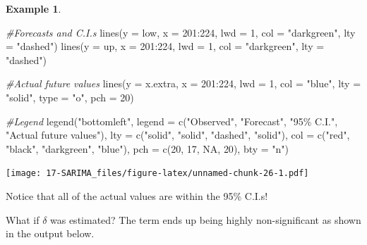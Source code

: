 \documentclass[
]{book}
\newenvironment{Shaded}{\begin{snugshade}}{\end{snugshade}}
\newcommand{\AttributeTok}[1]{\textcolor[rgb]{0.77,0.63,0.00}{#1}}
\newcommand{\CommentTok}[1]{\textcolor[rgb]{0.56,0.35,0.01}{\textit{#1}}}
\newcommand{\ConstantTok}[1]{\textcolor[rgb]{0.00,0.00,0.00}{#1}}
\newcommand{\DecValTok}[1]{\textcolor[rgb]{0.00,0.00,0.81}{#1}}
\newcommand{\FunctionTok}[1]{\textcolor[rgb]{0.00,0.00,0.00}{#1}}
\newcommand{\NormalTok}[1]{#1}
\newcommand{\SpecialCharTok}[1]{\textcolor[rgb]{0.00,0.00,0.00}{#1}}
\newcommand{\StringTok}[1]{\textcolor[rgb]{0.31,0.60,0.02}{#1}}
\theoremstyle{definition}
\theoremstyle{definition}
\newtheorem{example}{Example}[chapter]
\theoremstyle{definition}
\theoremstyle{definition}
\theoremstyle{remark}
\begin{document}
\begin{example}
\begin{Shaded}
\begin{Highlighting}[]
\CommentTok{\#Forecasts and C.I.s}
  \FunctionTok{lines}\NormalTok{(}\AttributeTok{y =}\NormalTok{ low, }\AttributeTok{x =} \DecValTok{201}\SpecialCharTok{:}\DecValTok{224}\NormalTok{, }\AttributeTok{lwd =} \DecValTok{1}\NormalTok{, }\AttributeTok{col =} \StringTok{"darkgreen"}\NormalTok{, }\AttributeTok{lty =} \StringTok{"dashed"}\NormalTok{) }
  \FunctionTok{lines}\NormalTok{(}\AttributeTok{y =}\NormalTok{ up, }\AttributeTok{x =} \DecValTok{201}\SpecialCharTok{:}\DecValTok{224}\NormalTok{, }\AttributeTok{lwd =} \DecValTok{1}\NormalTok{, }\AttributeTok{col =} \StringTok{"darkgreen"}\NormalTok{, }\AttributeTok{lty =} \StringTok{"dashed"}\NormalTok{) }
  
\CommentTok{\#Actual future values}
  \FunctionTok{lines}\NormalTok{(}\AttributeTok{y =}\NormalTok{ x.extra, }\AttributeTok{x =} \DecValTok{201}\SpecialCharTok{:}\DecValTok{224}\NormalTok{, }\AttributeTok{lwd =} \DecValTok{1}\NormalTok{, }\AttributeTok{col =} \StringTok{"blue"}\NormalTok{, }\AttributeTok{lty =} \StringTok{"solid"}\NormalTok{, }\AttributeTok{type =} \StringTok{"o"}\NormalTok{, }\AttributeTok{pch =} \DecValTok{20}\NormalTok{) }
  
\CommentTok{\#Legend}
  \FunctionTok{legend}\NormalTok{(}\StringTok{"bottomleft"}\NormalTok{, }\AttributeTok{legend =} \FunctionTok{c}\NormalTok{(}\StringTok{"Observed"}\NormalTok{, }\StringTok{"Forecast"}\NormalTok{, }\StringTok{"95\% C.I."}\NormalTok{, }\StringTok{"Actual future values"}\NormalTok{), }
         \AttributeTok{lty =} \FunctionTok{c}\NormalTok{(}\StringTok{"solid"}\NormalTok{, }\StringTok{"solid"}\NormalTok{, }\StringTok{"dashed"}\NormalTok{, }\StringTok{"solid"}\NormalTok{),}
         \AttributeTok{col =} \FunctionTok{c}\NormalTok{(}\StringTok{"red"}\NormalTok{, }\StringTok{"black"}\NormalTok{, }\StringTok{"darkgreen"}\NormalTok{, }\StringTok{"blue"}\NormalTok{), }\AttributeTok{pch =} \FunctionTok{c}\NormalTok{(}\DecValTok{20}\NormalTok{, }\DecValTok{17}\NormalTok{, }\ConstantTok{NA}\NormalTok{, }\DecValTok{20}\NormalTok{), }\AttributeTok{bty =} \StringTok{"n"}\NormalTok{)}
\end{Highlighting}
\end{Shaded}

\texttt{[image: 17-SARIMA\_files/figure-latex/unnamed-chunk-26-1.pdf]}

Notice that all of the actual values are within the 95\% C.I.s!

What if \(\delta\) was estimated? The term ends up being highly non-significant as shown in the output below.


\end{example}
\end{document}
